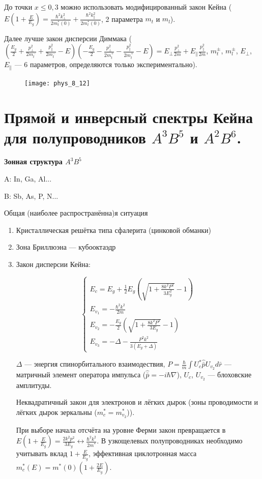 До точки $x\leq 0,3$ можно использовать модифицированный закон Кейна ($\displaystyle E\left(1+\frac{E}{E_g}\right)=\frac{\hbar^2 k_\perp^2}{2 m_t^*(0)}+\frac{\hbar^2 k_\parallel^2}{2 m_l^*(0)}$, 2 параметра $m_t$ и $m_l$).

Далее лучше закон дисперсии Диммака ($\left(\frac{E_g}{2}+\frac{p_\perp^2}{2 m_t^{-}}+\frac{p_\parallel^2}{2 m_t^{-}}-E\right)\left(-\frac{E_g}{2}-\frac{p_\perp^2}{2 m_t^{+}}-\frac{p_\parallel^2}{2 m_t ^+}-E\right)=E_\perp \frac{p_\perp^2}{2 m}+E_\parallel \frac{p_\parallel^2}{2 m}$, $m_t^{ \pm}$, $m_l^{ \pm}$, $E_\perp$, $E_\parallel$ ---  6 параметров, определяются только экспериментально).


\begin{figure}[h!]
    \centering
    \texttt{[image: phys\_8\_12]}
\end{figure}

\section{Прямой и инверсный спектры Кейна для полупроводников $A^3B^5$ и $A^2B^6$.}

\textbf{Зонная структура $A^3B^5$}

A: In, Ga, Al...

B: Sb, As, P, N...

Общая (наиболее распространённа)я ситуация

\begin{enumerate}
    \item Кристаллическая решётка типа сфалерита (цинковой обманки)
    \item Зона Бриллюэна --- кубооктаэдр
    \item Закон дисперсии Кейна:

    $$\left\{ \begin{array}{c}
        E_c=E_g+\frac{1}{2} E_g \left( \sqrt{1+\frac{8k^2P^2}{3E_g^2}} -1  \right) \\
        E_{v_1} = -\frac{\hbar^2 k^2}{2m}\\
        E_{v_2} = -\frac{E_g}{2}\left( \sqrt{1+\frac{8k^2P^2}{3E_g}} -1 \right)\\
        E_{v_3} = -\Delta - \frac{P^2k^2}{3(E_g+\Delta)}
    \end{array} \right.$$
    
    $\Delta$ --- энергия спинорбитального взаимодествия, $P=\frac{\hbar}{m} \int U^*_c \hat{\bar{p}} U_{v_2} d\bar{r}$ --- матричный элемент оператора импульса ($\hat{\bar{p}}=-i\hbar \nabla$), $U_c$, $U_{v_2}$ --- блоховские амплитуды.
    
    Неквадратичный закон для электронов и лёгких дырок (зоны проводимости и лёгких дырок зеркальны ($m_c^*=m_{v_2}^*$)).
    
    При выборе начала отсчёта на уровне Ферми закон превращается в $E\left(1+\frac{E}{E_g}\right)=\frac{2 k^2 p^2}{3 E_g} \leftrightarrow \frac{\hbar^2 k^2}{2 m^*}$. В узкощелевых полупроводниках необходимо учитывать вклад $1+\frac{E}{E_g}$, эффективная циклотронная масса  $m^*_c(E)=m^*(0)(1+\frac{2E}{E_g})$.
\end{enumerate}

